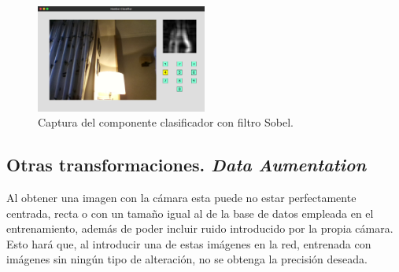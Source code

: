 \begin{figure}[H]
	\begin{center}
		\includegraphics[width=0.5\textwidth]{figures/componente2}
		\caption{Captura del componente clasificador con filtro Sobel.}
		\label{fig.componente2}
	\end{center}
\end{figure}

\subsection{Otras transformaciones. \textit{Data Aumentation}}
Al obtener una imagen con la cámara esta puede no estar perfectamente centrada, recta o con un tamaño igual al de la base de datos empleada en el entrenamiento, además de poder incluir ruido introducido por la propia cámara. Esto hará que, al introducir una de estas imágenes en la red, entrenada con imágenes sin ningún tipo de alteración, no se obtenga la precisión deseada.\\


